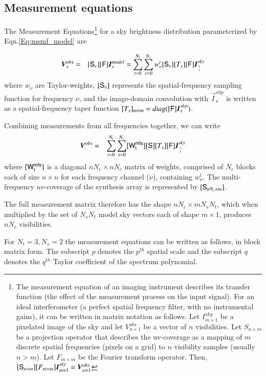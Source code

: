 \documentclass[structabstract]{stylefiles/aa}
\newcommand{\F}{{\tens{F}}}
\newcommand{\Sa}{{\tens{S}}}
\newcommand{\Sna}{\tens{{S_{\nu}}}}
\newcommand{\Wnt}{{\tens{W^{mfs}_t}}}
\newcommand{\wnt}{{w_{\nu}^t}}
\begin{document}
\subsection{Measurement equations}\label{Sec:meqn}
The {Measurement Equations\footnote
{
The measurement equation of an imaging instrument describes its transfer function (the effect of
the measurement process on the input signal).
For an ideal interferometer (a perfect spatial frequency filter, with no instrumental gains),
it can be written in matrix notation as follows. 
Let $I^{sky}_{m\times 1}$ be a pixelated image of the sky and let $V^{obs}_{n\times 1}$
be a vector of $n$ visibilities. 
Let $S_{n\times m}$ be a projection operator that describes
the uv-coverage as a mapping of $m$ discrete spatial 
frequencies (pixels on a grid) to $n$ visibility samples (usually $n>m$).
Let $F_{m\times m}$ be the Fourier transform operator.
Then, $[{\Sa}_{n\times m}] [F_{m\times m}] \vec{I}^{sky}_{m\times 1} = \vec{V}^{obs}_{n\times 1} $
}
}for a sky brightness distribution parameterized by Eqn.\ref{Eq:msmf_model} are

\begin{eqnarray}
\vec{V}^{obs}_{\nu} &=& [\Sna][\F]\vec{I}^{model}_{\nu}
= \sum_{t=0}^{N_t} \sum_{s=0}^{N_s} \wnt [\Sna][T_s][\F] \vec{I}^{sky}_{s\atop t}
\label{Eq:msmfs_meqn}
\end{eqnarray}
where $w_{\nu}$ are Taylor-weights, $[\Sna]$ represents the 
spatial-frequency sampling function for frequency $\nu$, and 
the image-domain convolution with $\vec{I}^{shp}_s$ is written as a spatial-frequency
taper function $[T_s]_{m\times m} = diag([\F] \vec{I}^{shp}_s)$.

Combining measurements from all frequencies together, we can write
\begin{eqnarray}
\vec{V}^{obs} &=& \sum_{t=0}^{N_t} \sum_{s=0}^{N_s} [\Wnt][\Sa][T_s] [\F] \vec{I}^{sky}_{s\atop t}
\label{Eq:msmfs_meqn}
\end{eqnarray}
where $[\Wnt]$ is a diagonal $nN_c\times nN_c$ matrix of weights, comprised of $N_c$ blocks each
of size $n\times n$ for each frequency channel ($\nu$), containing $\wnt$. 
The multi-frequency $uv$-coverage of the synthesis array is represented by $[\Sa_{nN_c\times m}]$.

The full measurement matrix therefore has the shape
$nN_c\times mN_sN_t$, which when multiplied by the set of $N_sN_t$ model sky vectors each
of shape $m\times 1$, produces $nN_c$ visibilities.

\noindent For $N_t=3, N_s=2$ the measurement equations can be written as follows, in
block matrix form. The subscript $p$ denotes the $p^{th}$ spatial scale
and the subscript $q$ denotes the $q^{th}$ Taylor coefficient of the spectrum
polynomial.
\end{document}
